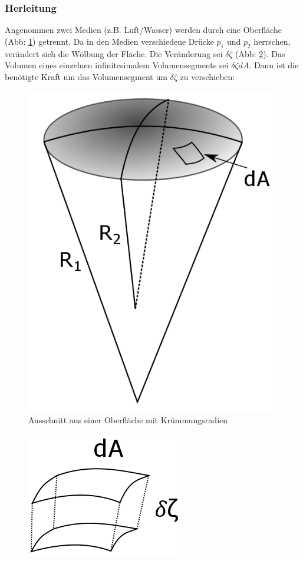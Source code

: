 \begin{refsection}
\subsubsection{Herleitung}\label{YL-Herleitung}
Angenommen zwei Medien (z.B. Luft/Wasser) werden durch eine Oberfläche \. (Abb: \ref{fig:YoungCone}) getrennt. Da in den Medien verschiedene Drücke $p_1$ und $p_2$ herrschen, verändert sich die Wölbung der Fläche. Die Veränderung sei $\delta \zeta$ \.(Abb: \ref{fig:Volumentransaltion}). Das Volumen eines einzelnen infinitesimalem Volumensegments sei $\delta \zeta dA$. Dann ist die benötigte Kraft um das Volumensegment um $\delta\zeta$ zu verschieben:
\begin{figure}\label{fig:YoungCone}
  \centering
  \includegraphics[scale=0.3]{minimal/YoungCone.png}
  \caption{Ausschnitt aus einer Oberfläche mit Krümmungsradien} 
\end{figure}
\begin{figure}\label{fig:Volumentransaltion}
  \centering
  \includegraphics[scale=0.3]{minimal/Volumetranslation.png}

\end{figure}
\end{refsection}
